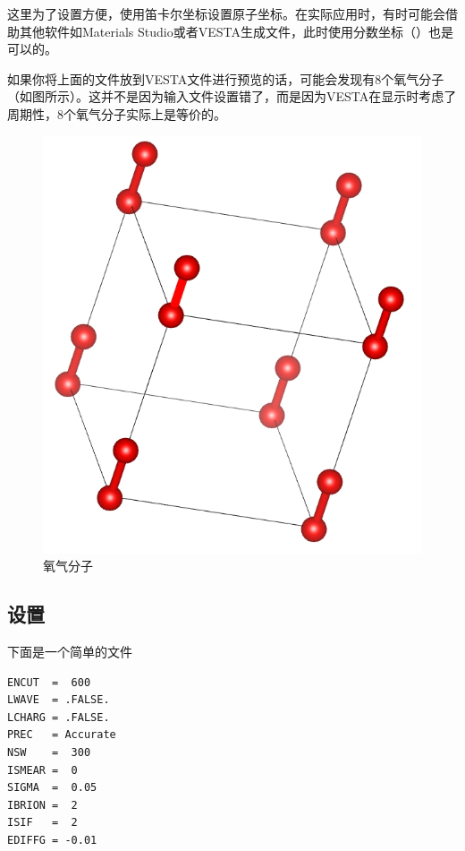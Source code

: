 这里为了设置方便，使用笛卡尔坐标设置原子坐标。在实际应用时，有时可能会借助其他软件如Materials Studio或者VESTA生成文件，此时使用分数坐标（）也是可以的。

\begin{extend}
    如果你将上面的文件放到VESTA文件进行预览的话，可能会发现有8个氧气分子（如图所示）。这并不是因为输入文件设置错了，而是因为VESTA在显示时考虑了周期性，8个氧气分子实际上是等价的。

    \begin{figure}
        \centering
        \includegraphics[width=1\linewidth]{VASP计算/结构优化/对坐标进行优化/fig/氧气分子.png}
        \caption{氧气分子}
        \label{fig:对坐标进行优化ISIF=2-氧气分子}
    \end{figure}
\end{extend}

\subsection{设置}\label{subsec:对坐标进行优化ISIF=2-INCAR设置}

下面是一个简单的文件

\begin{lstlisting}[caption=INCAR]
ENCUT  =  600
LWAVE  = .FALSE.
LCHARG = .FALSE.
PREC   = Accurate
NSW    =  300
ISMEAR =  0
SIGMA  =  0.05
IBRION =  2
ISIF   =  2
EDIFFG = -0.01
\end{lstlisting}

